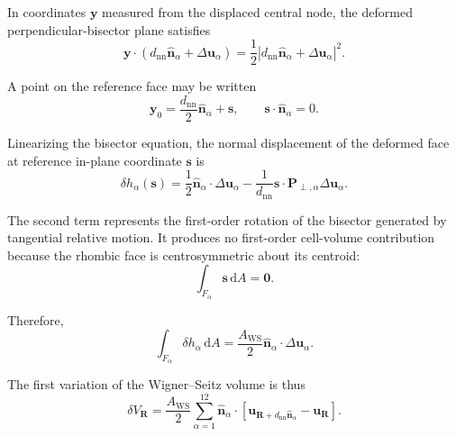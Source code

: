 In coordinates $\mathbf{y}$ measured from the displaced central node, the deformed perpendicular-bisector plane satisfies
\begin{equation}
    \mathbf{y}\cdot
    \left(
        d_{\mathrm{nn}}\hat{\mathbf{n}}_{\alpha}
        +
        \Delta\mathbf{u}_{\alpha}
    \right)
    =
    \frac{1}{2}
    \left|
        d_{\mathrm{nn}}\hat{\mathbf{n}}_{\alpha}
        +
        \Delta\mathbf{u}_{\alpha}
    \right|^2.
\end{equation}

A point on the reference face may be written
\begin{equation}
    \mathbf{y}_0
    =
    \frac{d_{\mathrm{nn}}}{2}
    \hat{\mathbf{n}}_{\alpha}
    +
    \boldsymbol{s},
    \qquad
    \boldsymbol{s}\cdot
    \hat{\mathbf{n}}_{\alpha}
    =
    0.
\end{equation}

Linearizing the bisector equation, the normal displacement of the deformed face at reference in-plane coordinate $\boldsymbol{s}$ is
\begin{equation}
    \delta h_{\alpha}(\boldsymbol{s})
    =
    \frac{1}{2}
    \hat{\mathbf{n}}_{\alpha}
    \cdot
    \Delta\mathbf{u}_{\alpha}
    -
    \frac{1}{d_{\mathrm{nn}}}
    \boldsymbol{s}
    \cdot
    \mathbf{P}_{\perp,\alpha}
    \Delta\mathbf{u}_{\alpha}.
\end{equation}

The second term represents the first-order rotation of the bisector generated by tangential relative motion. It produces no first-order cell-volume contribution because the rhombic face is centrosymmetric about its centroid:
\begin{equation}
    \int_{F_{\alpha}}
    \boldsymbol{s}\,\mathrm{d}A
    =
    \mathbf{0}.
\end{equation}

Therefore,
\begin{equation}
    \int_{F_{\alpha}}
    \delta h_{\alpha}\,\mathrm{d}A
    =
    \frac{A_{\mathrm{WS}}}{2}
    \hat{\mathbf{n}}_{\alpha}
    \cdot
    \Delta\mathbf{u}_{\alpha}.
\end{equation}

The first variation of the Wigner--Seitz volume is thus
\begin{equation}
    \delta V_{\mathbf{R}}
    =
    \frac{A_{\mathrm{WS}}}{2}
    \sum_{\alpha=1}^{12}
    \hat{\mathbf{n}}_{\alpha}
    \cdot
    \left[
        \mathbf{u}_{\mathbf{R}+d_{\mathrm{nn}}\hat{\mathbf{n}}_{\alpha}}
        -
        \mathbf{u}_{\mathbf{R}}
    \right].
\end{equation}

